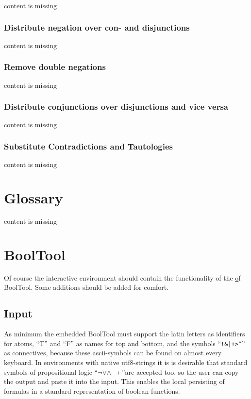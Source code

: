 content is missing

\subsubsection{Distribute negation over con- and disjunctions}

content is missing

\subsubsection{Remove double negations}

content is missing

\subsubsection{Distribute conjunctions over disjunctions and vice versa}

content is missing

\subsubsection{Substitute Contradictions and Tautologies}

content is missing

\section{Glossary}

content is missing

\section{BoolTool}

Of course the interactive environment should contain the functionality of the \href{web fronted} of BoolTool.
Some additions should be added for comfort.

\subsection{Input}

As minimum the embedded BoolTool must support the latin letters as identifiers for atoms, 
“T” and “F” as names for top and bottom, and the symbols
“\verb#!&|+>^#” as connectives, because these ascii-symbols can be found on almost every keyboard.
In environments with native utf8-strings it is is desirable that standard symbols of propositional logic
“$ \neg \vee \wedge \rightarrow $”are accepted too, 
so the user can copy the output and paste it into the input. 
This enables the local persisting of formulas in a standard representation of boolean functions.

